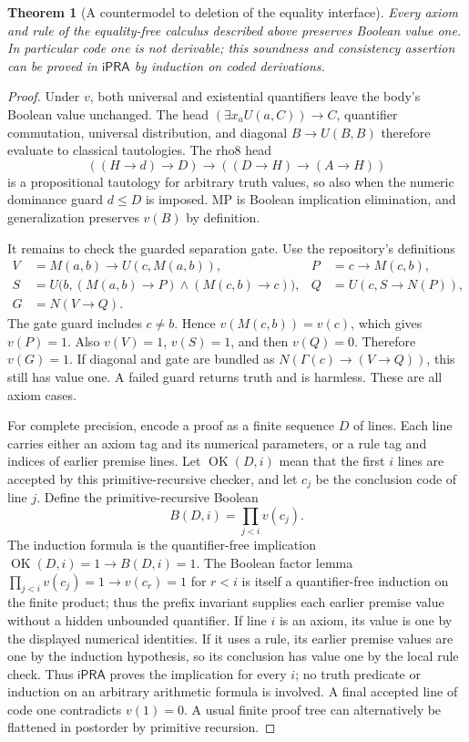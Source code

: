 \documentclass[11pt]{article}
\newtheorem{theorem}{Theorem}
\newcommand{\ipra}{\mathsf{iPRA}}
\begin{document}
\begin{theorem}[A countermodel to deletion of the equality interface]
Every axiom and rule of the equality-free calculus described above preserves
Boolean value one. In particular code one is not derivable; this soundness
and consistency assertion can be proved in $\ipra$ by induction on coded
derivations.
\end{theorem}
\begin{proof}
Under $v$, both universal and existential quantifiers leave the body's
Boolean value unchanged. The head $(\exists x_a U(a,C))\to C$, quantifier
commutation, universal distribution, and diagonal $B\to U(B,B)$ therefore
evaluate to classical tautologies. The rho8 head
\[
 ((H\to d)\to D)\to((D\to H)\to(A\to H))
\]
is a propositional tautology for arbitrary truth values, so also when the
numeric dominance guard $d\le D$ is imposed. MP is Boolean implication
elimination, and generalization preserves $v(B)$ by definition.

It remains to check the guarded separation gate. Use the repository's
definitions
\begin{align*}
 V&=M(a,b)\to U(c,M(a,b)),&
 P&=c\to M(c,b),\\
 S&=U\bigl(b,(M(a,b)\to P)\wedge(M(c,b)\to c)\bigr),&
 Q&=U(c,S\to N(P)),\\
 G&=N(V\to Q).
\end{align*}
The gate guard includes $c\ne b$. Hence $v(M(c,b))=v(c)$, which gives
$v(P)=1$. Also $v(V)=1$, $v(S)=1$, and then $v(Q)=0$.
Therefore $v(G)=1$. If diagonal and gate are bundled as
$N(\Gamma(c)\to(V\to Q))$, this still has value one.
A failed guard returns truth and is harmless. These are all axiom cases.

For complete precision, encode a proof as a finite sequence $D$ of lines.
Each line carries either an axiom tag and its numerical parameters, or a
rule tag and indices of earlier premise lines. Let $\operatorname{OK}(D,i)$
mean that the first $i$ lines are accepted by this primitive-recursive
checker, and let $c_j$ be the conclusion code of line $j$. Define the
primitive-recursive Boolean
\[
 B(D,i)=\prod_{j<i} v(c_j).
\]
The induction formula is the quantifier-free implication
$\operatorname{OK}(D,i)=1\to B(D,i)=1$.
The Boolean factor lemma
$\prod_{j<i}v(c_j)=1\to v(c_r)=1$ for $r<i$ is itself a
quantifier-free induction on the finite product; thus the prefix invariant
supplies each earlier premise value without a hidden unbounded quantifier.
If line $i$ is an axiom, its value is one by the displayed numerical
identities. If it uses a rule, its earlier premise values are one by the
induction hypothesis, so its conclusion has value one by the local rule
check. Thus $\ipra$ proves the implication for every $i$; no truth predicate
or induction on an arbitrary arithmetic formula is involved. A final
accepted line of code one contradicts $v(1)=0$. A usual finite proof tree
can alternatively be flattened in postorder by primitive recursion.
\end{proof}
\end{document}
